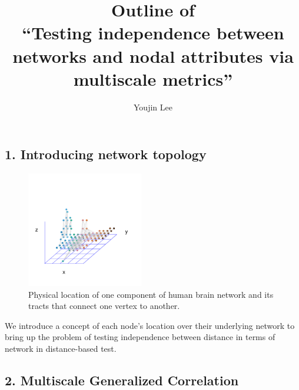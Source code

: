\documentclass[12pt]{article}
\begin{document}
	
	\title{Outline of \\``Testing independence between networks and nodal attributes via multiscale metrics''}
	
	\author{Youjin Lee}
	
	\maketitle
		
\subsection*{1. Introducing network topology}

\begin{figure}[H]
	\centering
	\includegraphics[width=2in]{../Figure/intro.pdf}	
	\caption{Physical location of one component of human brain network and its tracts that connect one vertex to another.}
	\label{fig:intro}
\end{figure}

We introduce a concept of each node's location over their underlying network to bring up the problem of testing independence between distance in terms of network in distance-based test. 


\subsection*{2. Multiscale Generalized Correlation}
\end{document}
